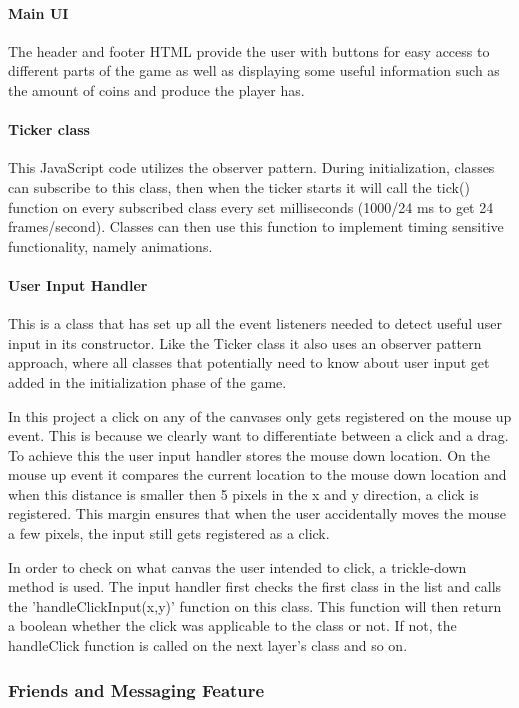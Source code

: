\documentclass[12pt]{article}
\begin{document}
\paragraph{Main UI} The header and footer HTML provide the user with buttons for easy access to different parts of the
game as well as displaying some useful information such as the amount of coins and produce the player has.

\paragraph{Ticker class} This JavaScript code utilizes the observer pattern. During initialization, classes can
subscribe to this class, then when the  ticker starts it will call the tick() function on every subscribed class every
set milliseconds (1000/24 ms to get 24 frames/second). Classes can then use this function to implement timing sensitive
functionality, namely animations.

\paragraph{User Input Handler} This is a class that has set up all the event listeners needed to detect useful user
input in its constructor. Like the Ticker class it also uses an observer pattern approach, where all classes that
potentially need to know about user input get added in the initialization phase of the game.

In this project a click on any of the canvases only gets registered on the mouse up event. This is because we clearly
want to differentiate between a click and a drag. To achieve this the user input handler stores the mouse down location.
On the mouse up event it compares the current location to the mouse down location and when this distance is smaller then
5 pixels in the x and y direction, a click is registered. This margin ensures that when the user accidentally moves the
mouse a few pixels, the input still gets registered as a click.

In order to check on what canvas the user intended to click, a trickle-down method is used. The input handler first
checks the first class in the list and calls the 'handleClickInput(x,y)' function on this class. This function will then
return a boolean whether the click was applicable to the class or not. If not, the handleClick function is called on the
next layer's class and so on.


\subsubsection{Friends and Messaging Feature}
\end{document}
